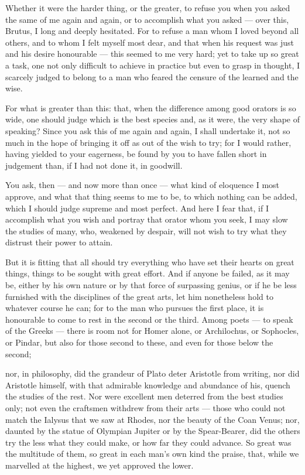 
 Whether it were the harder thing, or the greater, to refuse you when you asked the same of me again and again, or to accomplish what you asked — over this, Brutus, I long and deeply hesitated. For to refuse a man whom I loved beyond all others, and to whom I felt myself most dear, and that when his request was just and his desire honourable — this seemed to me very hard; yet to take up so great a task, one not only difficult to achieve in practice but even to grasp in thought, I scarcely judged to belong to a man who feared the censure of the learned and the wise.

 For what is greater than this: that, when the difference among good orators is so wide, one should judge which is the best species and, as it were, the very shape of speaking? Since you ask this of me again and again, I shall undertake it, not so much in the hope of bringing it off as out of the wish to try; for I would rather, having yielded to your eagerness, be found by you to have fallen short in judgement than, if I had not done it, in goodwill.

 You ask, then — and now more than once — what kind of eloquence I most approve, and what that thing seems to me to be, to which nothing can be added, which I should judge supreme and most perfect. And here I fear that, if I accomplish what you wish and portray that orator whom you seek, I may slow the studies of many, who, weakened by despair, will not wish to try what they distrust their power to attain.

 But it is fitting that all should try everything who have set their hearts on great things, things to be sought with great effort. And if anyone be failed, as it may be, either by his own nature or by that force of surpassing genius, or if he be less furnished with the disciplines of the great arts, let him nonetheless hold to whatever course he can; for to the man who pursues the first place, it is honourable to come to rest in the second or the third. Among poets — to speak of the Greeks — there is room not for Homer alone, or Archilochus, or Sophocles, or Pindar, but also for those second to these, and even for those below the second;

 nor, in philosophy, did the grandeur of Plato deter Aristotle from writing, nor did Aristotle himself, with that admirable knowledge and abundance of his, quench the studies of the rest. Nor were excellent men deterred from the best studies only; not even the craftsmen withdrew from their arts — those who could not match the Ialysus that we saw at Rhodes, nor the beauty of the Coan Venus; nor, daunted by the statue of Olympian Jupiter or by the Spear-Bearer, did the others try the less what they could make, or how far they could advance. So great was the multitude of them, so great in each man's own kind the praise, that, while we marvelled at the highest, we yet approved the lower.

